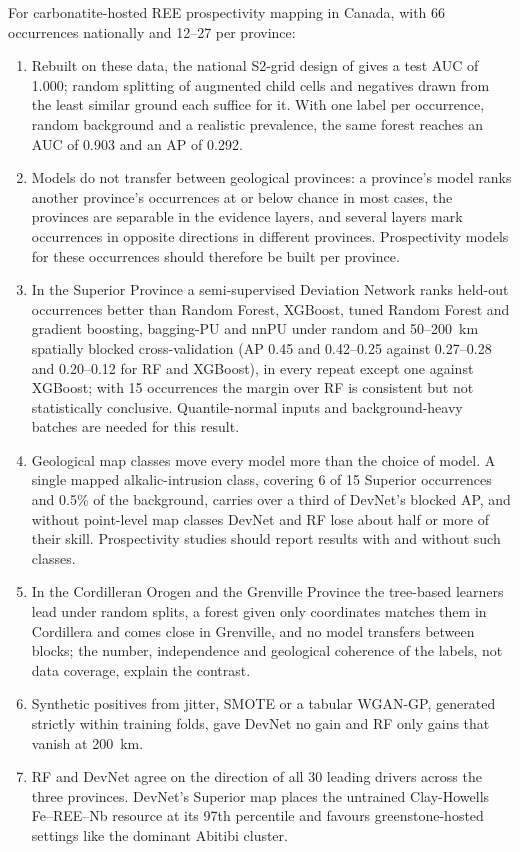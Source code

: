 \documentclass[pdflatex,sn-apa]{sn-jnl}
\begin{document}
For carbonatite-hosted REE prospectivity mapping in Canada, with 66 occurrences nationally and 12--27 per province:
\begin{enumerate}
\item Rebuilt on these data, the national S2-grid design of \citet{Parsa2024} gives a test AUC of 1.000; random splitting of augmented child cells and negatives drawn from the least similar ground each suffice for it. With one label per occurrence, random background and a realistic prevalence, the same forest reaches an AUC of 0.903 and an AP of 0.292.
\item Models do not transfer between geological provinces: a province's model ranks another province's occurrences at or below chance in most cases, the provinces are separable in the evidence layers, and several layers mark occurrences in opposite directions in different provinces. Prospectivity models for these occurrences should therefore be built per province.
\item In the Superior Province a semi-supervised Deviation Network ranks held-out occurrences better than Random Forest, XGBoost, tuned Random Forest and gradient boosting, bagging-PU and nnPU under random and 50--200~km spatially blocked cross-validation (AP 0.45 and 0.42--0.25 against 0.27--0.28 and 0.20--0.12 for RF and XGBoost), in every repeat except one against XGBoost; with 15 occurrences the margin over RF is consistent but not statistically conclusive. Quantile-normal inputs and background-heavy batches are needed for this result.
\item Geological map classes move every model more than the choice of model. A single mapped alkalic-intrusion class, covering 6 of 15 Superior occurrences and 0.5\% of the background, carries over a third of DevNet's blocked AP, and without point-level map classes DevNet and RF lose about half or more of their skill. Prospectivity studies should report results with and without such classes.
\item In the Cordilleran Orogen and the Grenville Province the tree-based learners lead under random splits, a forest given only coordinates matches them in Cordillera and comes close in Grenville, and no model transfers between blocks; the number, independence and geological coherence of the labels, not data coverage, explain the contrast.
\item Synthetic positives from jitter, SMOTE or a tabular WGAN-GP, generated strictly within training folds, gave DevNet no gain and RF only gains that vanish at 200~km.
\item RF and DevNet agree on the direction of all 30 leading drivers across the three provinces. DevNet's Superior map places the untrained Clay-Howells Fe--REE--Nb resource at its 97th percentile and favours greenstone-hosted settings like the dominant Abitibi cluster.
\end{enumerate}
\end{document}
